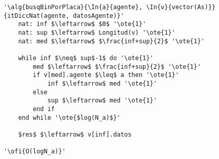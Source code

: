 \begin{lstlisting}[mathescape]
'\alg{busqBinPorPlaca}{\In{a}{agente}, \In{v}{vector(As)}}{itDiccNat(agente, datosAgente)}'
	nat: inf $\leftarrow$ $0$ '\ote{1}'
	nat: sup $\leftarrow$ Longitud(v) '\ote{1}'
	nat: med $\leftarrow$ $\frac{inf+sup}{2}$ '\ote{1}'

	while inf $\neq$ sup$-1$ do '\ote{1}'
		med $\leftarrow$ $\frac{inf+sup}{2}$ '\ote{1}'
		if v[med].agente $\leq$ a then '\ote{1}'
			inf $\leftarrow$ med '\ote{1}'
		else
			sup $\leftarrow$ med '\ote{1}'
		end if
	end while '\ote{$log(N_a)$}'

	$res$ $\leftarrow$ v[inf].datos

'\ofi{O(logN_a)}'
\end{lstlisting}